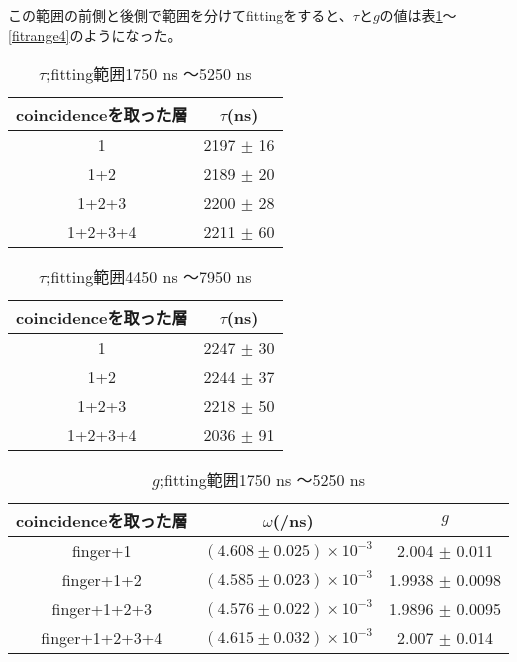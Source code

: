 この範囲の前側と後側で範囲を分けてfittingをすると、$\tau$と$g$の値は表\ref{fitrange1}〜\ref{fitrange4}のようになった。
\begin{table}[H]
\caption{$\tau$;fitting範囲1750 ns 〜5250 ns}
\label{fitrange1}
\begin{center}
\begin{tabular}{cc}\toprule
coincidenceを取った層 	& $\tau$(ns) \\ \midrule
1 			& 2197 $\pm$ 16 \\
1+2 			& 2189 $\pm$ 20 \\
1+2+3 			& 2200 $\pm$ 28 \\
1+2+3+4 		& 2211 $\pm$ 60 \\ \bottomrule
\end{tabular}
\end{center}
\end{table}%

\begin{table}[H]
\caption{$\tau$;fitting範囲4450 ns 〜7950 ns}
\label{fitrange2}
\begin{center}
\begin{tabular}{cc}\toprule
coincidenceを取った層 	& $\tau$(ns) \\ \midrule
1 			& 2247 $\pm$ 30 \\
1+2 			& 2244 $\pm$ 37 \\
1+2+3 			& 2218 $\pm$ 50 \\
1+2+3+4 		& 2036 $\pm$ 91 \\ \bottomrule
\end{tabular}
\end{center}
\end{table}%

\begin{table}[H]
\caption{$g$;fitting範囲1750 ns 〜5250 ns}
\label{fitrange3}
\begin{center}
\begin{tabular}{ccc}\toprule
coincidenceを取った層 	& $\omega$(/ns) 			& $g$ \\ \midrule
finger+1 		& $( 4.608 \pm 0.025 ) \times 10^{-3}$ 	& 2.004  $\pm$ 0.011 \\
finger+1+2 		& $( 4.585 \pm 0.023 ) \times 10^{-3}$ 	& 1.9938 $\pm$ 0.0098 \\
finger+1+2+3 		& $( 4.576 \pm 0.022 ) \times 10^{-3}$ 	& 1.9896 $\pm$ 0.0095 \\
finger+1+2+3+4 		& $( 4.615 \pm 0.032 ) \times 10^{-3}$ 	& 2.007  $\pm$ 0.014 \\ \bottomrule
\end{tabular}
\end{center}
\end{table}%

